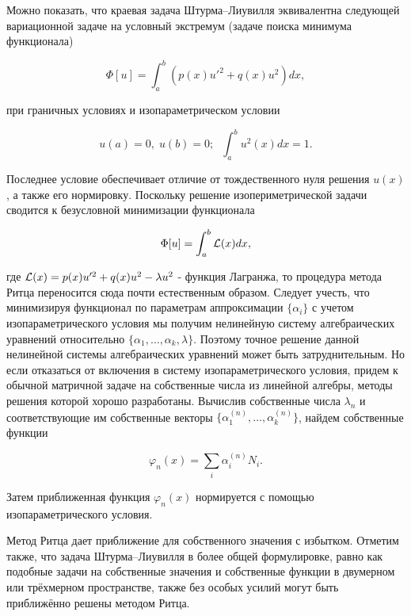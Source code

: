 \documentclass{article}
\begin{document}
Можно показать, что краевая задача Штурма–Лиувилля эквивалентна следующей вариационной задаче на условный экстремум (задаче поиска минимума функционала)

\begin{displaymath}
	\Phi[u] = \int_{a}^{b} \left( p(x)u'^{2} + q(x)u^{2} \right) dx,
\end{displaymath}

\noindent при граничных условиях и изопараметрическом условии

\begin{displaymath}
	u(a) = 0, \; u(b) = 0; \; \; \int_{a}^{b} u^{2}(x)dx = 1.
\end{displaymath}

Последнее условие обеспечивает отличие от тождественного нуля решения $u(x)$, а также его нормировку. Поскольку решение изопериметрической задачи сводится к безусловной минимизации функционала

\begin{displaymath}
	\Phi[u] = \int_{a}^{b} \mathcal{L}(x) dx, 
\end{displaymath}

\noindent где $\mathcal{L}(x) = p(x)u'^{2} + q(x)u^{2} - \lambda u^{2}$ - функция Лагранжа, то процедура метода Ритца переносится сюда почти естественным образом. Следует учесть, что минимизируя функционал по параметрам аппроксимации $\{\alpha_{i}\}$ с учетом изопараметрического условия мы получим нелинейную систему алгебраических уравнений относительно $\{\alpha_{1}, \dots, \alpha_{k}, \lambda\}$. Поэтому точное решение данной нелинейной системы алгебраических уравнений может быть затруднительным. Но если отказаться от включения в систему изопараметрического условия, придем к обычной матричной задаче на собственные числа из линейной алгебры, методы решения которой хорошо разработаны. Вычислив собственные числа $\lambda_{n}$ и соответствующие им собственные векторы $\{\alpha_{1}^{(n)}, \dots, \alpha_{k}^{(n)}\}$, найдем собственные функции

\begin{displaymath}
	\varphi_{n}(x) = \sum_{i}^{} \alpha_{i}^{(n)} N_{i}. 
\end{displaymath}

\noindent Затем приближенная функция $\varphi_{n}(x)$ нормируется с помощью изопараметрического условия.

\begin{info}
	Метод Ритца дает приближение для собственного значения с избытком. Отметим также, что задача Штурма–Лиувилля в более общей формулировке, равно как подобные задачи на собственные значения и собственные функции в двумерном или трёхмерном пространстве, также без особых усилий могут быть приближённо решены методом Ритца.
\end{info}
\end{document}

